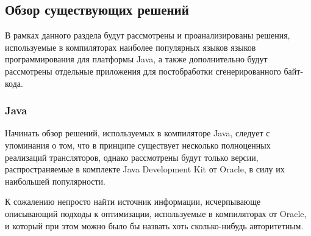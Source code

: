 \subsection{Обзор существующих решений}

В рамках данного раздела будут рассмотрены и проанализированы решения, используемые в компиляторах
наиболее популярных языков языков программирования для платформы Java, а также дополнительно
будут рассмотрены отдельные приложения для постобработки сгенерированного байт-кода.

\subsubsection{Java}
Начинать обзор решений, используемых в компиляторе Java, следует с упоминания о том, что в принципе
существует несколько полноценных реализаций трансляторов, однако рассмотрены будут только версии,
распространяемые в комплекте Java Development Kit от Oracle, в силу их наибольшей популярности.

К сожалению непросто найти источник информации, исчерпывающе описывающий подходы к оптимизации,
используемые в компиляторах от Oracle, и который при этом можно было бы назвать хоть сколько-нибудь
авторитетным.

